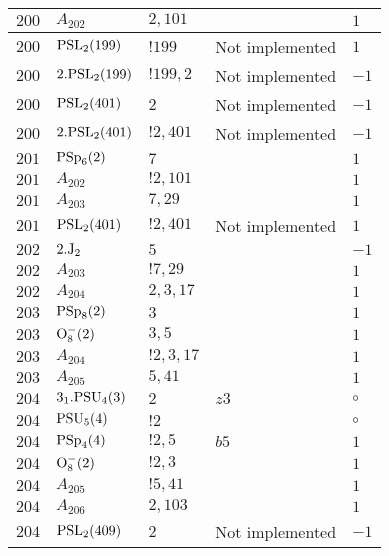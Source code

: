 \documentclass[a4paper, 11pt]{article}
\begin{document}
\begin{longtable}{lllll}
        $ 200 $ & $ A_{202} $ & $ 2, 101 $ & $ ~ $ & $ 1$ \\ \hline
        $ 200 $ & $ {\rm PSL}_{2}(199) $ & $ !199 $ &  Not implemented & $ 1$ \\ \hline
        $ 200 $ & $ 2.{\rm PSL}_{2}(199) $ & $ !199, 2 $ &  Not implemented & $ -1$ \\ \hline
        $ 200 $ & $ {\rm PSL}_{2}(401) $ & $ 2 $ &  Not implemented & $ -1$ \\ \hline
        $ 200 $ & $ 2.{\rm PSL}_{2}(401) $ & $ !2, 401 $ &  Not implemented & $ -1$ \\ \hline
        $ 201 $ & $ {\rm PSp}_{6}(2) $ & $ 7 $ & $ ~ $ & $ 1$ \\ \hline
        $ 201 $ & $ A_{202} $ & $ !2, 101 $ & $ ~ $ & $ 1$ \\ \hline
        $ 201 $ & $ A_{203} $ & $ 7, 29 $ & $ ~ $ & $ 1$ \\ \hline
        $ 201 $ & $ {\rm PSL}_{2}(401) $ & $ !2, 401 $ &  Not implemented & $ 1$ \\ \hline
        $ 202 $ & $ 2.{\rm J}_2 $ & $ 5 $ & $ ~ $ & $ -1$ \\ \hline
        $ 202 $ & $ A_{203} $ & $ !7, 29 $ & $ ~ $ & $ 1$ \\ \hline
        $ 202 $ & $ A_{204} $ & $ 2, 3, 17 $ & $ ~ $ & $ 1$ \\ \hline
        $ 203 $ & $ {\rm PSp}_{8}(2) $ & $ 3 $ & $ ~ $ & $ 1$ \\ \hline
        $ 203 $ & $ {\rm O}_{8}^-(2) $ & $ 3, 5 $ & $ ~ $ & $ 1$ \\ \hline
        $ 203 $ & $ A_{204} $ & $ !2, 3, 17 $ & $ ~ $ & $ 1$ \\ \hline
        $ 203 $ & $ A_{205} $ & $ 5, 41 $ & $ ~ $ & $ 1$ \\ \hline
        $ 204 $ & $ 3_1.{\rm PSU}_{4}(3) $ & $ 2 $ & $ z3 $ &  $\circ$ \\ \hline
        $ 204 $ & $ {\rm PSU}_{5}(4) $ & $ ! 2 $ & $ ~ $ &  $\circ$ \\ \hline
        $ 204 $ & $ {\rm PSp}_{4}(4) $ & $ ! 2,5 $ & $ b5 $ & $ 1$ \\ \hline
        $ 204 $ & $ {\rm O}_{8}^-(2) $ & $ ! 2,3 $ & $ ~ $ & $ 1$ \\ \hline
        $ 204 $ & $ A_{205} $ & $ !5, 41 $ & $ ~ $ & $ 1$ \\ \hline
        $ 204 $ & $ A_{206} $ & $ 2, 103 $ & $ ~ $ & $ 1$ \\ \hline
        $ 204 $ & $ {\rm PSL}_{2}(409) $ & $ 2 $ &  Not implemented & $ -1$ \\ \hline

\end{longtable}
\end{document}
